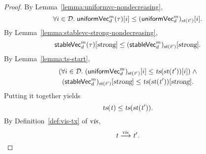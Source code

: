 \begin{proof}
  By Lemma~\ref{lemma:uniformvc-nondecreasing},
  \[
    \forall i \in \mathcal{D}.\;
      {\sf uniformVec}^{m}_{d}(\tau)[i] \le ({\sf uniformVec}^{m}_{d})_{\textsl{st}(\mathit{t}')}[i].
  \]
  By Lemma~\ref{lemma:stablevc-strong-nondecreasing},
  \[
    {\sf stableVec}^{m}_{d}(\tau)[\textsl{strong}] \le
      ({\sf stableVec}^{m}_{d})_{\textsl{st}(\mathit{t}')}[\textsl{strong}].
  \]
  By Lemma~\ref{lemma:ts-start},
  \begin{gather*}
    (\forall i \in \mathcal{D}.\; ({\sf uniformVec}^{m}_{d})_{\textsl{st}(\mathit{t}')}[i]
      \le \textsl{ts}(\textsl{st}(\mathit{t}'))[i])
    \;\land \\
    ({\sf stableVec}^{m}_{d})_{\textsl{st}(\mathit{t}')}[\textsl{strong}]
      \le \textsl{ts}(\textsl{st}(\mathit{t}'))[\textsl{strong}].
  \end{gather*}
  Putting it together yields
  \[
    \textsl{ts}(\mathit{t}) \le \textsl{ts}(\textsl{st}(\mathit{t}')).
  \]
  By Definition~\ref{def:vis-tx} of $\textsl{vis}$,
  \[
    \mathit{t} \xrightarrow{\textsl{vis}} \mathit{t}'.
  \]
\end{proof}
